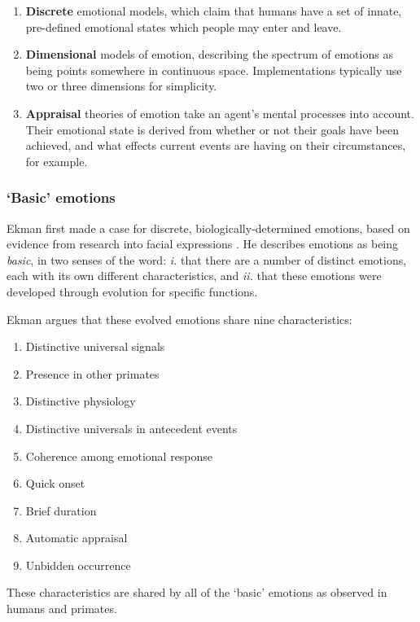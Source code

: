 \documentclass[11pt]{report}
\begin{document}
\begin{enumerate}
 \item \textbf{Discrete} emotional models, which claim that humans have a set of innate, pre-defined emotional states which people may enter and leave.
 \item \textbf{Dimensional} models of emotion, describing the spectrum of emotions as being points somewhere in continuous space. Implementations typically use two or three dimensions for simplicity.
 \item \textbf{Appraisal} theories of emotion take an agent's mental processes into account. Their emotional state is derived from whether or not their goals have been achieved, and what effects current events are having on their circumstances, for example.
\end{enumerate}

\subsubsection{`Basic' emotions}
Ekman first made a case for discrete, biologically-determined emotions, based on evidence from research into facial expressions \citep{ekman1992argument}. He describes emotions as being \emph{basic}, in two senses of the word: \emph{i.} that there are a number of distinct emotions, each with its own different characteristics, and \emph{ii.} that these emotions were developed through evolution for specific functions.

Ekman argues that these evolved emotions share nine characteristics:

\begin{enumerate}
  \item Distinctive universal signals
  \item Presence in other primates
  \item Distinctive physiology
  \item Distinctive universals in antecedent events
  \item Coherence among emotional response
  \item Quick onset
  \item Brief duration
  \item Automatic appraisal
  \item Unbidden occurrence
\end{enumerate}

These characteristics are shared by all of the `basic' emotions as observed in humans and primates.
\end{document}
